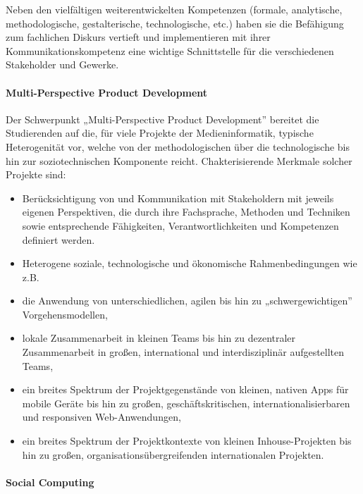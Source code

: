 Neben den vielfältigen weiterentwickelten Kompetenzen (formale,
analytische, methodologische, gestalterische, technologische, etc.)
haben sie die Befähigung zum fachlichen Diskurs vertieft und
implementieren mit ihrer Kommunikationskompetenz eine wichtige
Schnittstelle für die verschiedenen Stakeholder und Gewerke.

\paragraph{Multi-Perspective Product
Development}\label{multi-perspective-product-development}

Der Schwerpunkt „Multi-Perspective Product Development'' bereitet die
Studierenden auf die, für viele Projekte der Medieninformatik, typische
Heterogenität vor, welche von der methodologischen über die
technologische bis hin zur soziotechnischen Komponente reicht.
Chakterisierende Merkmale solcher Projekte sind:

\begin{itemize}
\tightlist
\item
  Berücksichtigung von und Kommunikation mit Stakeholdern mit jeweils
  eigenen Perspektiven, die durch ihre Fachsprache, Methoden und
  Techniken sowie entsprechende Fähigkeiten, Verantwortlichkeiten und
  Kompetenzen definiert werden.
\item
  Heterogene soziale, technologische und ökonomische Rahmenbedingungen
  wie z.B.
\item
  die Anwendung von unterschiedlichen, agilen bis hin zu
  „schwergewichtigen'' Vorgehensmodellen,
\item
  lokale Zusammenarbeit in kleinen Teams bis hin zu dezentraler
  Zusammenarbeit in großen, international und interdisziplinär
  aufgestellten Teams,
\item
  ein breites Spektrum der Projektgegenstände von kleinen, nativen Apps
  für mobile Geräte bis hin zu großen, geschäftskritischen,
  internationalisierbaren und responsiven Web-Anwendungen,
\item
  ein breites Spektrum der Projektkontexte von kleinen Inhouse-Projekten
  bis hin zu großen, organisationsübergreifenden internationalen
  Projekten.
\end{itemize}

\paragraph{Social Computing}\label{social-computing}

